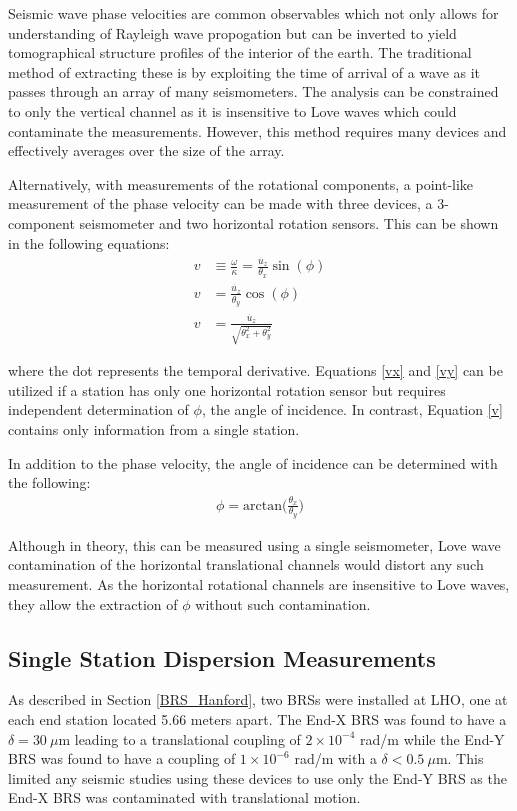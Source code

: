 \documentclass [12pt, proquest]{uwthesis}[2019]
\begin{document}
Seismic wave phase velocities are common observables which not only allows for understanding of Rayleigh wave propogation but can be inverted to yield tomographical structure profiles of the interior of the earth. \cite{tomography} The traditional method of extracting these is by exploiting the time of arrival of a wave as it passes through an array of many seismometers. The analysis can be constrained to only the vertical channel as it is insensitive to Love waves which could contaminate the measurements. However, this method requires many devices and effectively averages over the size of the array.

Alternatively, with measurements of the rotational components, a point-like measurement of the phase velocity can be made with three devices, a 3-component seismometer and two horizontal rotation sensors. This can be shown in the following equations:
\begin{align} 
v&\equiv\frac{\omega}{\kappa} = \frac{\dot{u_z}}{\theta_x}\sin(\phi) \label{vx} \\
v&=\frac{\dot{u_z}}{\theta_y}\cos(\phi)\label{vy} \\
v&=\frac{\dot{u_z}}{\sqrt{\theta_x^2+\theta_y^2}} \label{v}
\end{align}

where the dot represents the temporal derivative. Equations \ref{vx} and \ref{vy} can be utilized if a station has only one horizontal rotation sensor but requires independent determination of $\phi$, the angle of incidence. In contrast, Equation \ref{v} contains only information from a single station.

In addition to the phase velocity, the angle of incidence can be determined with the following:
\begin{align}
\phi=\text{arctan}\bigg(\frac{\theta_x}{\theta_y}\bigg)
\end{align}

Although in theory, this can be measured using a single seismometer, Love wave contamination of the horizontal translational channels would distort any such measurement. As the horizontal rotational channels are insensitive to Love waves, they allow the extraction of $\phi$ without such contamination.  

\subsection{Single Station Dispersion Measurements}
As described in Section \ref{BRS_Hanford}, two BRSs were installed at LHO, one at each end station located 5.66 meters apart. The End-X BRS was found to have a $\delta=30\ \mu \text{m}$ leading to a translational coupling of $2 \times 10^{-4}$ rad/m while the End-Y BRS was found to have a coupling of $1 \times 10^{-6}$ rad/m with a $\delta<0.5\ \mu \text{m}$. This limited any seismic studies using these devices to use only the End-Y BRS as the End-X BRS was contaminated with translational motion. 
\end{document}
